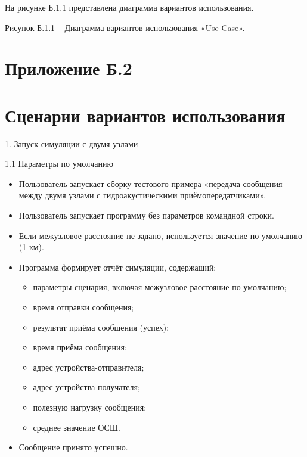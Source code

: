 На рисунке Б.1.1 представлена диаграмма вариантов использования.

Рисунок Б.1.1 -- Диаграмма вариантов использования «Use Case».

\section{Приложение
Б.2}\label{ux43fux440ux438ux43bux43eux436ux435ux43dux438ux435-ux431.2}

\section{Сценарии вариантов
использования}\label{ux441ux446ux435ux43dux430ux440ux438ux438-ux432ux430ux440ux438ux430ux43dux442ux43eux432-ux438ux441ux43fux43eux43bux44cux437ux43eux432ux430ux43dux438ux44f}

1. Запуск симуляции с двумя узлами

1.1 Параметры по умолчанию

\begin{itemize}
\item
  Пользователь запускает сборку тестового примера «передача сообщения
  между двумя узлами с гидроакустическими приёмопередатчиками».
\item
  Пользователь запускает программу без параметров командной строки.
\item
  Если межузловое расстояние не задано, используется значение по
  умолчанию (1 км).
\item
  Программа формирует отчёт симуляции, содержащий:

  \begin{itemize}
  \item
    параметры сценария, включая межузловое расстояние по умолчанию;
  \item
    время отправки сообщения;
  \item
    результат приёма сообщения (успех);
  \item
    время приёма сообщения;
  \item
    адрес устройства-отправителя;
  \item
    адрес устройства-получателя;
  \item
    полезную нагрузку сообщения;
  \item
    среднее значение ОСШ.
  \end{itemize}
\item
  Сообщение принято успешно.
\end{itemize}

